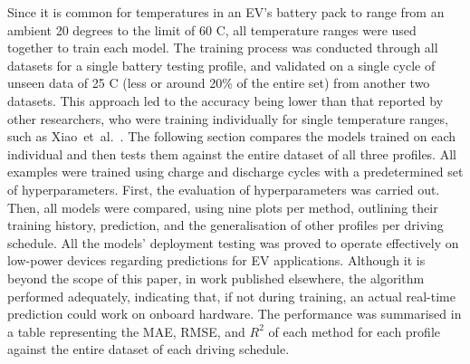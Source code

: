 %
Since it is common for temperatures in an EV's battery pack to range from an ambient 20 degrees to the limit of 60 \textdegree{}C, all temperature ranges were used together to train each model.
The training process was conducted through all datasets for a single battery testing profile, and validated on a single cycle of unseen data of 25 \textdegree{}C (less or around 20\% of the entire set) from another two datasets.
This approach led to the accuracy being lower than that reported by other researchers, who were training individually for single temperature ranges, such as \mbox{Xiao et al.~\cite{xiao_accurate_2019}}.
The following section compares the models trained on each individual and then tests them against the entire dataset of all three profiles.
All examples were trained using charge and discharge cycles with a predetermined set of hyperparameters.
First, the evaluation of hyperparameters was carried out.
Then, all models were compared, using nine plots per method, outlining their training history, prediction, and the generalisation of other profiles per driving schedule.
All the models' deployment testing was proved to operate effectively on low-power devices regarding predictions for EV applications.
Although it is beyond the scope of this paper, in work published elsewhere, the algorithm performed adequately, indicating that, if not during training, an actual real-time prediction could work on onboard hardware.
The performance was summarised in a table representing the MAE, RMSE, and $R^2$ of each method for each profile against the entire dataset of each driving schedule.
%

%

